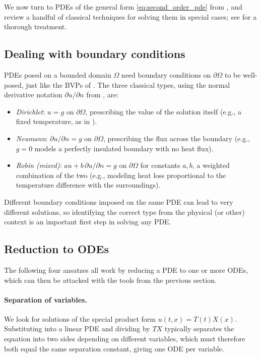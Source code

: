 We now turn to PDEs of the general form \eqref{eq:second_order_pde}
from , and review a handful of classical techniques
for solving them in special cases; see \cite{strauss2007partial} for a
thorough treatment.

\subsection{Dealing with boundary conditions}

PDEs posed on a bounded domain $\Omega$ need boundary conditions on
$\partial\Omega$ to be well-posed, just like the BVPs of
. The three classical types, using the normal derivative
notation $\partial u/\partial n$ from
, are:
\begin{itemize}
    \item \emph{Dirichlet}: $u = g$ on $\partial\Omega$, prescribing
    the value of the solution itself (e.g., a fixed temperature, as in
    ).
    \item \emph{Neumann}: $\partial u/\partial n = g$ on
    $\partial\Omega$, prescribing the flux across the boundary (e.g.,
    $g=0$ models a perfectly insulated boundary with no heat flux).
    \item \emph{Robin (mixed)}: $au + b \, \partial u/\partial n = g$
    on $\partial\Omega$ for constants $a,b$, a weighted combination of
    the two (e.g., modeling heat loss proportional to the temperature
    difference with the surroundings).
\end{itemize}
Different boundary conditions imposed on the same PDE can lead to very
different solutions, so identifying the correct type from the physical
(or other) context is an important first step in solving any PDE.

\subsection{Reduction to ODEs}

The following four ansatzes all work by reducing a PDE to one or more
ODEs, which can then be attacked with the tools from the previous
section.

\paragraph{Separation of variables.}
We look for solutions of the special product form $u(t,x) =
T(t)X(x)$. Substituting into a linear PDE and dividing by $TX$
typically separates the equation into two sides depending on different
variables, which must therefore both equal the same separation
constant, giving one ODE per variable.

